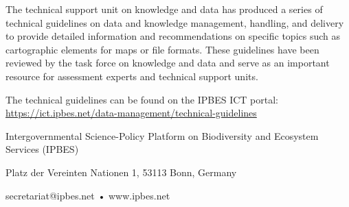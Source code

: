 \documentclass{article}
\begin{document}
The technical support unit on knowledge and data has produced a series of technical guidelines on data and knowledge management, handling, and delivery to provide detailed information and recommendations on specific topics such as cartographic elements for maps or file formats. These guidelines have been reviewed by the task force on knowledge and data and serve as an important resource for assessment experts and technical support units. 

The technical guidelines can be found on the IPBES ICT portal: \href{https://ict.ipbes.net/data-management/technical-guidelines}{https://ict.ipbes.net/data-management/technical-guidelines}


Intergovernmental Science-Policy Platform on Biodiversity and Ecosystem Services (IPBES)

Platz der Vereinten Nationen 1, 53113 Bonn, Germany 

secretariat@ipbes.net • www.ipbes.net
\end{document}
